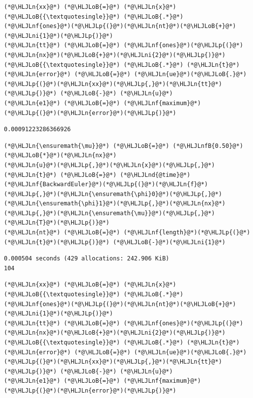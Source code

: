 \documentclass[12pt,a4paper]{article}
\newcommand{\HLJLn}[1]{#1}
\newcommand{\HLJLnd}[1]{\textcolor[RGB]{214,102,97}{#1}}
\newcommand{\HLJLnf}[1]{\textcolor[RGB]{66,102,213}{#1}}
\newcommand{\HLJLnfB}[1]{\textcolor[RGB]{59,151,46}{#1}}
\newcommand{\HLJLni}[1]{\textcolor[RGB]{59,151,46}{#1}}
\newcommand{\HLJLoB}[1]{\textcolor[RGB]{102,102,102}{\textbf{#1}}}
\newcommand{\HLJLp}[1]{#1}
\begin{document}
\begin{lstlisting}
(*@\HLJLn{xx}@*) (*@\HLJLoB{=}@*) (*@\HLJLn{x}@*)(*@\HLJLoB{{\textquotesingle}}@*) (*@\HLJLoB{.*}@*) (*@\HLJLnf{ones}@*)(*@\HLJLp{(}@*)(*@\HLJLn{nt}@*)(*@\HLJLoB{+}@*)(*@\HLJLni{1}@*)(*@\HLJLp{)}@*)
(*@\HLJLn{tt}@*) (*@\HLJLoB{=}@*) (*@\HLJLnf{ones}@*)(*@\HLJLp{(}@*)(*@\HLJLn{nx}@*)(*@\HLJLoB{+}@*)(*@\HLJLni{2}@*)(*@\HLJLp{)}@*)(*@\HLJLoB{{\textquotesingle}}@*) (*@\HLJLoB{.*}@*) (*@\HLJLn{t}@*)
(*@\HLJLn{error}@*) (*@\HLJLoB{=}@*) (*@\HLJLn{ue}@*)(*@\HLJLoB{.}@*)(*@\HLJLp{(}@*)(*@\HLJLn{xx}@*)(*@\HLJLp{,}@*)(*@\HLJLn{tt}@*)(*@\HLJLp{)}@*) (*@\HLJLoB{-}@*) (*@\HLJLn{u}@*) 
(*@\HLJLn{e1}@*) (*@\HLJLoB{=}@*) (*@\HLJLnf{maximum}@*)(*@\HLJLp{(}@*)(*@\HLJLn{error}@*)(*@\HLJLp{)}@*)
\end{lstlisting}

\begin{lstlisting}
0.00091223286366926
\end{lstlisting}


\begin{lstlisting}
(*@\HLJLn{\ensuremath{\mu}}@*) (*@\HLJLoB{=}@*) (*@\HLJLnfB{0.50}@*)(*@\HLJLoB{*}@*)(*@\HLJLn{nx}@*)
(*@\HLJLn{u}@*)(*@\HLJLp{,}@*)(*@\HLJLn{x}@*)(*@\HLJLp{,}@*)(*@\HLJLn{t}@*) (*@\HLJLoB{=}@*) (*@\HLJLnd{@time}@*) (*@\HLJLnf{BackwardEuler}@*)(*@\HLJLp{(}@*)(*@\HLJLn{f}@*)(*@\HLJLp{,}@*)(*@\HLJLn{\ensuremath{\phi}0}@*)(*@\HLJLp{,}@*)(*@\HLJLn{\ensuremath{\phi}1}@*)(*@\HLJLp{,}@*)(*@\HLJLn{nx}@*)(*@\HLJLp{,}@*)(*@\HLJLn{\ensuremath{\mu}}@*)(*@\HLJLp{,}@*)(*@\HLJLn{T}@*)(*@\HLJLp{)}@*)
(*@\HLJLn{nt}@*) (*@\HLJLoB{=}@*) (*@\HLJLnf{length}@*)(*@\HLJLp{(}@*)(*@\HLJLn{t}@*)(*@\HLJLp{)}@*) (*@\HLJLoB{-}@*)(*@\HLJLni{1}@*)
\end{lstlisting}

\begin{lstlisting}
0.000504 seconds (429 allocations: 242.906 KiB)
104
\end{lstlisting}


\begin{lstlisting}
(*@\HLJLn{xx}@*) (*@\HLJLoB{=}@*) (*@\HLJLn{x}@*)(*@\HLJLoB{{\textquotesingle}}@*) (*@\HLJLoB{.*}@*) (*@\HLJLnf{ones}@*)(*@\HLJLp{(}@*)(*@\HLJLn{nt}@*)(*@\HLJLoB{+}@*)(*@\HLJLni{1}@*)(*@\HLJLp{)}@*)
(*@\HLJLn{tt}@*) (*@\HLJLoB{=}@*) (*@\HLJLnf{ones}@*)(*@\HLJLp{(}@*)(*@\HLJLn{nx}@*)(*@\HLJLoB{+}@*)(*@\HLJLni{2}@*)(*@\HLJLp{)}@*)(*@\HLJLoB{{\textquotesingle}}@*) (*@\HLJLoB{.*}@*) (*@\HLJLn{t}@*)
(*@\HLJLn{error}@*) (*@\HLJLoB{=}@*) (*@\HLJLn{ue}@*)(*@\HLJLoB{.}@*)(*@\HLJLp{(}@*)(*@\HLJLn{xx}@*)(*@\HLJLp{,}@*)(*@\HLJLn{tt}@*)(*@\HLJLp{)}@*) (*@\HLJLoB{-}@*) (*@\HLJLn{u}@*) 
(*@\HLJLn{e1}@*) (*@\HLJLoB{=}@*) (*@\HLJLnf{maximum}@*)(*@\HLJLp{(}@*)(*@\HLJLn{error}@*)(*@\HLJLp{)}@*)
\end{lstlisting}
\end{document}
